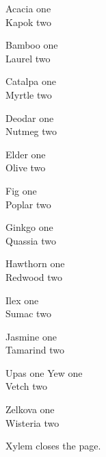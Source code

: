 \documentclass{article}
\begin{document}
{\tiny Acacia one\\Kapok two\par}

{\scriptsize Bamboo one\\Laurel two\par}

{\footnotesize Catalpa one\\Myrtle two\par}

{\small Deodar one\\Nutmeg two\par}

{\normalsize Elder one\\Olive two\par}

{\large Fig one\\Poplar two\par}

{\Large Ginkgo one\\Quassia two\par}

{\LARGE Hawthorn one\\Redwood two\par}

{\huge Ilex one\\Sumac two\par}

{\Huge Jasmine one\\Tamarind two\par}

Upas one {\small Yew} one\\Vetch two\par

{\small Zelkova one\\Wisteria two}\par

Xylem closes the page.
\end{document}
